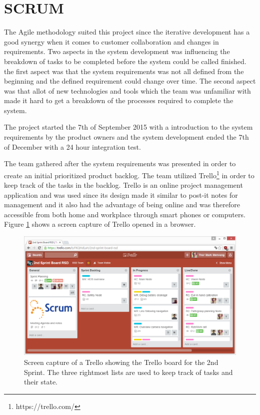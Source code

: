 \section{SCRUM \label{sec:scrum}}


The Agile methodology suited this project since the iterative development has a good synergy when it comes to customer collaboration and changes in requirements. Two aspects in the system development was influencing the breakdown of tasks to be completed before the system could be called finished. the first aspect was that the system requirements was not all defined from the beginning and the defined requirement could change over time. The second aspect was that allot of new technologies and tools which the team was unfamiliar with made it hard to get a breakdown of the processes required to complete the system.

The project started the 7th of September 2015 with a introduction to the system requirements by the product owners and the system development ended the 7th of December with a 24 hour integration test.

The team gathered after the system requirements was presented in order to create an initial prioritized product backlog. The team utilized Trello\footnote{https://trello.com/} in order to keep track of the tasks in the backlog. Trello is an online project management application and was used since its design made it similar to post-it notes for management and it also had the advantage of being online and was therefore accessible from both home and workplace through smart phones or computers. Figure \ref{fig:trello_cap} shows a screen capture of Trello opened in a browser.
\begin{figure}[H]
	\centering
	\includegraphics[width=\textwidth]{figs/trello_example.png}
	\caption{Screen capture of a Trello showing the Trello board for the 2nd Sprint. The three rightmost lists are used to keep track of tasks and their state.}
	\label{fig:trello_cap}
\end{figure}


